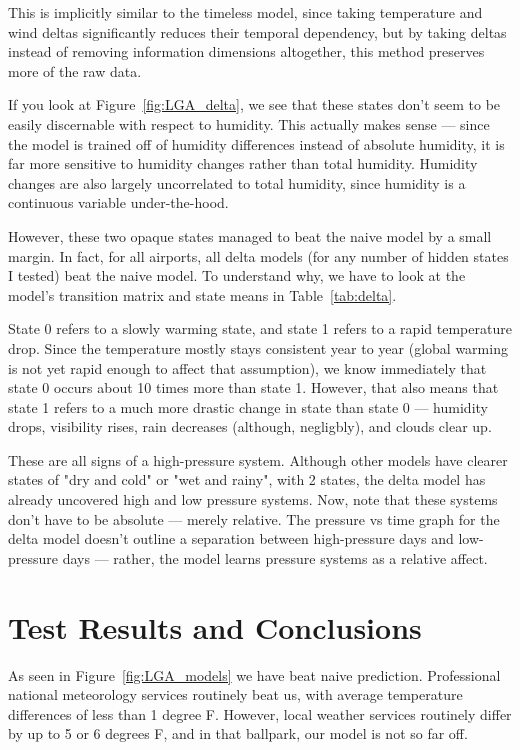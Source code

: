 \documentclass[a4paper]{article}
\begin{document}
This is implicitly similar to the timeless model, since taking temperature and wind deltas significantly reduces their temporal dependency, but by taking deltas instead of removing information dimensions altogether, this method preserves more of the raw data.

If you look at Figure~\ref{fig:LGA_delta}, we see that these states don't seem to be easily discernable with respect to humidity. This actually makes sense --- since the model is trained off of humidity differences instead of absolute humidity, it is far more sensitive to humidity changes rather than total humidity. Humidity changes are also largely uncorrelated to total humidity, since humidity is a continuous variable under-the-hood. 

However, these two opaque states managed to beat the naive model by a small margin. In fact, for all airports, all delta models (for any number of hidden states I tested) beat the naive model. To understand why, we have to look at the model's transition matrix and state means in Table~\ref{tab:delta}.

State 0 refers to a slowly warming state, and state 1 refers to a rapid temperature drop. Since the temperature mostly stays consistent year to year (global warming is not yet rapid enough to affect that assumption), we know immediately that state 0 occurs about 10 times more than state 1. However, that also means that state 1 refers to a much more drastic change in state than state 0 --- humidity drops, visibility rises, rain decreases (although, negligbly), and clouds clear up.

These are all signs of a high-pressure system.\cite{highpressure} Although other models have clearer states of "dry and cold" or "wet and rainy", with 2 states, the delta model has already uncovered high and low pressure systems. Now, note that these systems don't have to be absolute --- merely relative. The pressure vs time graph for the delta model doesn't outline a separation between high-pressure days and low-pressure days --- rather, the model learns pressure systems as a relative affect.



\section{Test Results and Conclusions}
As seen in Figure~\ref{fig:LGA_models} we have beat naive prediction. Professional national meteorology services routinely beat us, with average temperature differences of less than 1 degree F. However, local weather services routinely differ by up to 5 or 6 degrees F, and in that ballpark, our model is not so far off. 
\end{document}
